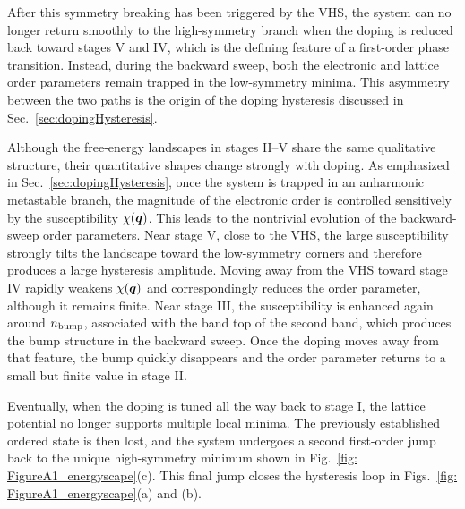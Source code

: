 \documentclass[aps,prx,article,twocolumn,amsmath,amssymb,superscriptaddress,longbibliography]{revtex4-2}
\begin{document}
After this symmetry breaking has been triggered by the VHS, the system can no longer return smoothly to the high-symmetry branch when the doping is reduced back toward stages V and IV, which is the defining feature of a first-order phase transition. Instead,  during the backward sweep, both the electronic and lattice order parameters remain trapped in the low-symmetry minima. This asymmetry between the two paths is the origin of the doping hysteresis discussed in Sec.~\ref{sec:dopingHysteresis}.

Although the free-energy landscapes in stages II--V share the same qualitative structure, their quantitative shapes change strongly with doping. As emphasized in Sec.~\ref{sec:dopingHysteresis}, once the system is trapped in an anharmonic metastable branch, the magnitude of the electronic order is controlled sensitively by the susceptibility $\chi({\vb*{q}})$. This leads to the nontrivial evolution of the backward-sweep order parameters. Near stage V, close to the VHS, the large susceptibility strongly tilts the landscape toward the low-symmetry corners and therefore produces a large hysteresis amplitude. Moving away from the VHS toward stage IV rapidly weakens $\chi({\vb*{q}})$ and correspondingly reduces the order parameter, although it remains finite. Near stage III, the susceptibility is enhanced again around $n_{\rm bump}$, associated with the band top of the second band, which produces the bump structure in the backward sweep. Once the doping moves away from that feature, the bump quickly disappears and the order parameter returns to a small but finite value in stage II. 

Eventually, when the doping is tuned all the way back to stage I, the lattice potential no longer supports multiple local minima. The previously established ordered state is then lost, and the system undergoes a second first-order jump back to the unique high-symmetry minimum shown in Fig.~\ref{fig: FigureA1_energyscape}(c). This final jump closes the hysteresis loop in Figs.~\ref{fig: FigureA1_energyscape}(a) and (b).



\end{document}
